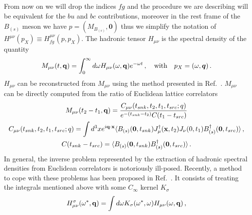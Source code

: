 From now on we will drop the indices $fg$
and the procedure we are describing will be equivalent for the $bu$ and $bc$ contributions,
moreover
in the rest frame of the $B_{(s)}$ meson we have $p=(M_{B_{(s)}},\bm{0})$ thus we simplify the notation of
$H^{\mu\nu}(p_X)\equiv H^{\mu\nu}_{fg}(p,p_X)$.
The hadronic tensor $H_{\mu\nu}$ is
the spectral density of the quantity
\begin{equation}
  M_{\mu\nu}(t,{\bf q})= \int_0^{\infty}d \omega H_{\mu\nu} (\omega,{\bf q}) e^{-\omega t}\,,\quad \text{with}\quad p_X=(\omega,\bm{q})\,.
\end{equation}
$H_{\mu\nu}$ can be reconstructed from $M_{\mu\nu}$ using the method presented in
Ref.~\cite{Hansen:2019idp}. $M_{\mu\nu}$ can be directly computed from the
ratio of Euclidean lattice correlators
\begin{gather}
  M_{\mu\nu}(t_2-t_1,{\bf q})=\frac{C_{\mu\nu}(t_{snk},t_2,t_1,t_{src};q)}{e^{-(t_{snk}-t_2)}  C(t_1-t_{src}) }\label{eq:ratio_4pt_2pt}\\
  \label{eq:4pt}
  C_{\mu\nu}(t_{snk},t_2,t_1,t_{src};q)=\int d^3x e^{i{\bf q}\cdot {\bf x}}
  \langle B_{(s)}({\bf 0}, t_{snk}) J^{\dagger}_\mu({\bf x},t_2)  J_\nu(0,t_1)
  B_{(s)}^\dagger({\bf 0}, t_{src})\rangle\,,\\
  \label{eq:2pt}
  C(t_{snk}-t_{src}) =  \langle B_{(s)}({\bf 0}, t_{snk})
  B_{(s)}^\dagger({\bf 0}, t_{src})\rangle\,.
\end{gather}
In general, the inverse problem represented by the extraction of
hadronic spectral densities from Euclidean correlators is notoriously
ill-posed. Recently, a method to cope with these problems has been
proposed in Ref.~\cite{Hansen:2019idp}. It consists of treating the
integrals mentioned above with some $C_\infty$ kernel $K_\sigma$
\begin{equation}
  H^\sigma_{\mu\nu}(\omega^*, {\bf q})= \int d \omega K_\sigma( \omega^*,\omega ) H_{\mu\nu}(\omega, {\bf q})\,,
\end{equation}
